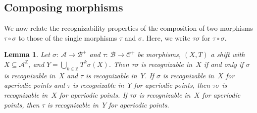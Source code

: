 \documentclass{amsart}
\newtheorem{lemma}{Lemma}[section]
\theoremstyle{definition}
\theoremstyle{remark}
\numberwithin{equation}{section}
\begin{document}
\subsection{Composing morphisms}
We now relate the recognizability properties of the composition of two morphisms $\tau \circ \sigma$ to those of the single morphisms $\tau$ and $\sigma$. 
Here, we write $\tau \sigma$ for $\tau \circ \sigma$. 

\begin{lemma}\label{lem:tele}
Let $\sigma:\, \mathcal{A} \to \mathcal{B}^+$ and $\tau:\, \mathcal{B}\to\mathcal{C}^+$ be morphisms, $(X,T)$ a shift with $X \subseteq \mathcal{A}^\mathbb{Z}$, and $Y = \bigcup_{k\in\mathbb{Z}} T^k \sigma(X)$. 
Then $\tau \sigma$ is recognizable in~$X$ if and only if $\sigma$ is recognizable in~$X$ and $\tau$ is recognizable in~$Y$. 
If $\sigma$ is recognizable in~$X$ for aperiodic points and $\tau$ is recognizable in~$Y$ for aperiodic points, then $\tau \sigma$ is recognizable in~$X$ for aperiodic points.
If $\tau \sigma$ is recognizable in~$X$ for aperiodic points, then $\tau$ is recognizable in~$Y$ for aperiodic points. 
\end{lemma}
\end{document}
